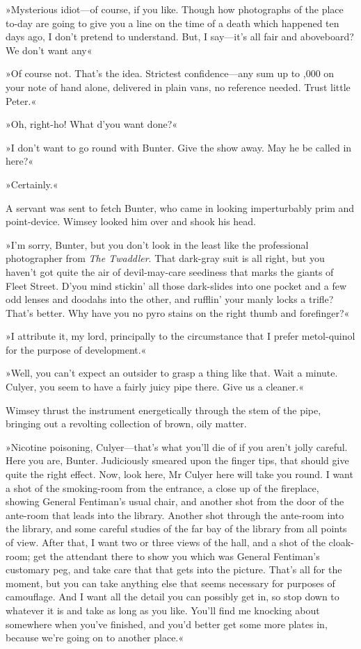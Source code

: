 »Mysterious idiot—of course, if you like. Though how photographs of the place to-day are going to give you a line on the time of a death which happened ten days ago, I don't pretend to understand. But, I say—it's all fair and aboveboard? We don't want any\longdash«

»Of course not. That's the idea. Strictest confidence—any sum up to ,000 on your note of hand alone, delivered in plain vans, no reference needed. Trust little Peter.«

»Oh, right-ho! What d'you want done?«

»I don't want to go round with Bunter. Give the show away. May he be called in here?«

»Certainly.«

A servant was sent to fetch Bunter, who came in looking imperturbably prim and point-device. Wimsey looked him over and shook his head.

»I'm sorry, Bunter, but you don't look in the least like the professional photographer from \textit{The Twaddler}. That dark-gray suit is all right, but you haven't got quite the air of devil-may-care seediness that marks the giants of Fleet Street. D'you mind stickin' all those dark-slides into one pocket and a few odd lenses and doodahs into the other, and rufflin' your manly locks a trifle? That's better. Why have you no pyro stains on the right thumb and forefinger?«

»I attribute it, my lord, principally to the circumstance that I prefer metol-quinol for the purpose of development.«

»Well, you can't expect an outsider to grasp a thing like that. Wait a minute. Culyer, you seem to have a fairly juicy pipe there. Give us a cleaner.«

Wimsey thrust the instrument energetically through the stem of the pipe, bringing out a revolting collection of brown, oily matter.

»Nicotine poisoning, Culyer—that's what you'll die of if you aren't jolly careful. Here you are, Bunter. Judiciously smeared upon the finger tips, that should give quite the right effect. Now, look here, Mr Culyer here will take you round. I want a shot of the smoking-room from the entrance, a close up of the fireplace, showing General Fentiman's usual chair, and another shot from the door of the ante-room that leads into the library. Another shot through the ante-room into the library, and some careful studies of the far bay of the library from all points of view. After that, I want two or three views of the hall, and a shot of the cloak-room; get the attendant there to show you which was General Fentiman's customary peg, and take care that that gets into the picture. That's all for the moment, but you can take anything else that seems necessary for purposes of camouflage. And I want all the detail you can possibly get in, so stop down to whatever it is and take as long as you like. You'll find me knocking about somewhere when you've finished, and you'd better get some more plates in, because we're going on to another place.«

